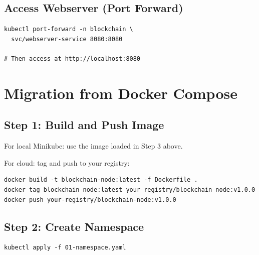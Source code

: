 \subsection{Access Webserver (Port Forward)}

\begin{listing}[H]
\caption{Port-Forward to Webserver Service}
\label{lst:ch23-port-forward}
\begin{verbatim}
kubectl port-forward -n blockchain \
  svc/webserver-service 8080:8080

# Then access at http://localhost:8080
\end{verbatim}
\end{listing}

\section{Migration from Docker Compose}
\label{sec:k8s-migration}

\subsection{Step 1: Build and Push Image}

For local Minikube: use the image loaded in Step 3 above.

For cloud: tag and push to your registry:

\begin{listing}[htbp]
\caption{Push to Container Registry}
\label{lst:ch23-push-image}
\begin{verbatim}
docker build -t blockchain-node:latest -f Dockerfile .
docker tag blockchain-node:latest your-registry/blockchain-node:v1.0.0
docker push your-registry/blockchain-node:v1.0.0
\end{verbatim}
\end{listing}

\subsection{Step 2: Create Namespace}

\begin{listing}[H]
\caption{Create Blockchain Namespace}
\label{lst:ch23-create-ns}
\begin{verbatim}
kubectl apply -f 01-namespace.yaml
\end{verbatim}
\end{listing}

